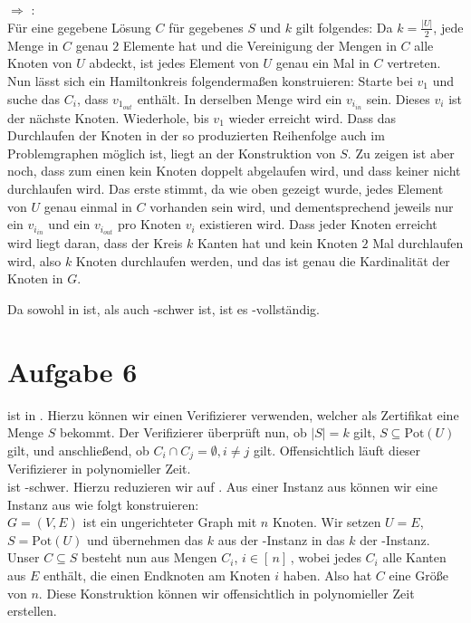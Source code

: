 \documentclass[a4paper,11pt]{scrartcl}
\begin{document}
	 $\Rightarrow$ :\\
	Für eine gegebene Lösung $C$ für gegebenes $S$ und $k$ gilt folgendes: Da $k= \frac{\vert U \vert}{2}$, jede Menge in $C$ genau $2$ Elemente hat und die Vereinigung der Mengen in $C$ alle Knoten von $U$ abdeckt, ist jedes Element von $U$ genau ein Mal in $C$ vertreten.\\
	Nun lässt sich ein Hamiltonkreis folgendermaßen konstruieren: Starte bei $v_1$ und suche das $C_i$, dass $v_{1_{out}}$ enthält. In derselben Menge wird ein $v_{i_{in}}$ sein. Dieses $v_i$ ist der nächste Knoten. Wiederhole, bis $v_1$ wieder erreicht wird. Dass das Durchlaufen der Knoten in der so produzierten Reihenfolge auch im Problemgraphen möglich ist, liegt an der Konstruktion von $S$. Zu zeigen ist aber noch, dass zum einen kein Knoten doppelt abgelaufen wird, und dass keiner nicht durchlaufen wird. Das erste stimmt, da wie oben gezeigt wurde, jedes Element von $U$ genau einmal in $C$ vorhanden sein wird, und dementsprechend jeweils nur ein $v_{i_{in}}$ und ein $v_{i_{out}}$ pro Knoten $v_i$ existieren wird. Dass jeder Knoten erreicht wird liegt daran, dass der Kreis $k$ Kanten hat und kein Knoten $2$ Mal durchlaufen wird, also $k$ Knoten durchlaufen werden, und das ist genau die Kardinalität der Knoten in $G$.
	
	Da  sowohl in  ist, als auch -schwer ist, ist es -vollständig.

\newpage

	\section*{Aufgabe 6}
	 ist in . Hierzu können wir einen Verifizierer verwenden, welcher als Zertifikat eine Menge $S$ bekommt. Der Verifizierer überprüft nun, ob $\vert S \vert = k$ gilt, $S \subseteq \text{Pot}(U)$ gilt, und anschließend, ob $C_i \cap C_j = \emptyset, i \neq j$ gilt. Offensichtlich läuft dieser Verifizierer in polynomieller Zeit.\\
	
	 ist -schwer. Hierzu reduzieren wir  auf . Aus einer Instanz aus  können wir eine Instanz aus  wie folgt konstruieren:\\
	$G=(V,E)$ ist ein ungerichteter Graph mit $n$ Knoten. Wir setzen $U = E$, $S = \text{Pot}(U)$ und übernehmen das $k$ aus der -Instanz in das $k$ der -Instanz. Unser $C \subseteq S$ besteht nun aus Mengen $C_i$, $i \in [\, n ]\,$, wobei jedes $C_i$ alle Kanten aus $E$ enthält, die einen Endknoten am Knoten $i$ haben. Also hat $C$ eine Größe von $n$. Diese Konstruktion können wir offensichtlich in polynomieller Zeit erstellen.\\
	
\end{document}
